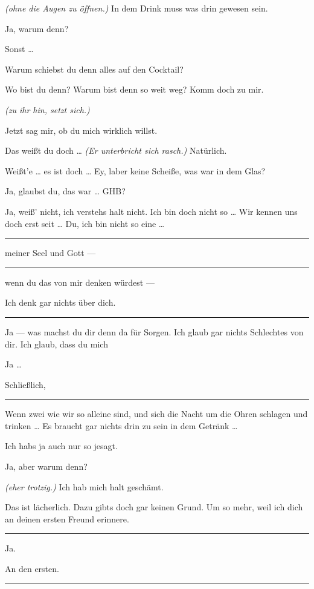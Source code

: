 \documentclass[
	final,
	a4paper,
	ngerman,
	mpinclude = true, %
	twoside = true,
	open = right,
	cleardoublepage = plain,
	DIV = 13,
	BCOR = 1cm,
	titlepage = firstiscover,
	]{scrbook}
\newcommand{\direction}[1]{\textit{(#1)}}
\newenvironment{deletion}{%
		\vspace{0.25\baselineskip}
		\hrule
		\vspace{0.25\baselineskip}
		\color{darkgray}
	}{
		\color{black}
		\vspace{0.25\baselineskip}
		\hrule 
		\vspace{0.25\baselineskip}
	}
\newcommand{\thecharacter}[1]{\textup{\textsc{#1}}\xspace}
\newcommand{\thegatte}{\thecharacter{Christian}}
\newcommand{\thesuesse}{\thecharacter{Lola}}
\newcommand{\character}[1]{\item[#1:]}
\newcommand{\gatte}{\character{\thegatte}}
\newcommand{\suesse}{\character{\thesuesse}}
\begin{document}
\begin{play}
	\suesse
	\direction{ohne die Augen zu öffnen.} In dem Drink muss was drin gewesen sein.

	\gatte
	Ja, warum denn?

	\suesse
	Sonst \ldots{}

	\gatte
	Warum schiebst du denn alles auf den Cocktail?

	\suesse
	Wo bist du denn? Warum bist denn so weit weg? Komm doch zu mir.

	\gatte
	\direction{zu ihr hin, setzt sich.}

	\suesse
	Jetzt sag mir, ob du mich wirklich willst.

	\gatte
	Das weißt du doch \ldots{} \direction{Er unterbricht sich rasch.} Natürlich.

	\suesse
	Weißt'e \ldots{} es ist doch \ldots{} Ey, laber keine Scheiße, was war in dem Glas?

	\gatte
	Ja, glaubst du, das war \ldots{} GHB?

	\suesse
	Ja, weiß' nicht, ich verstehs halt nicht. Ich bin doch nicht so \ldots{} Wir kennen uns doch erst seit \ldots{} Du, ich bin nicht so eine \ldots{}
	\begin{deletion}
	meiner Seel und Gott ---
	\end{deletion}
	wenn du das von mir denken würdest ---

	\gatte
	Ich denk gar nichts über dich.
	\begin{deletion}
	Ja --- was machst du dir denn da für Sorgen. Ich glaub gar nichts Schlechtes von dir. Ich glaub, dass du mich

	\suesse
	Ja \ldots{}

	\gatte
	Schließlich,
	\end{deletion}
	Wenn zwei wie wir so alleine sind, und sich die Nacht um die Ohren schlagen und trinken \ldots{} Es braucht gar nichts drin zu sein in dem Getränk \ldots{}

	\suesse
	Ich habs ja auch nur so jesagt.

	\gatte
	Ja, aber warum denn?

	\suesse
	\direction{eher trotzig.} Ich hab mich halt geschämt.

	\gatte
	Das ist lächerlich. Dazu gibts doch gar keinen Grund. Um so mehr, weil ich dich an deinen ersten Freund erinnere.

	\begin{deletion}
	\suesse
	Ja.

	\gatte
	An den ersten.
	\end{deletion}


\end{play}
\end{document}
